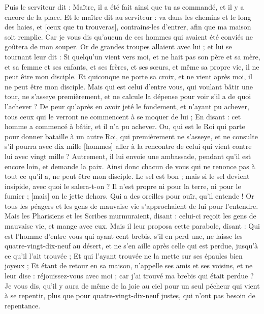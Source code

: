 \begin{multicols}{2}
Puis le serviteur dit : Maître, il a été fait ainsi que tu as commandé, et il y a encore de la place.
Et le maître dit au serviteur : va dans les chemins et le long des haies, et [ceux que tu trouveras], contrains-les d'entrer, afin que ma maison soit remplie.
Car je vous dis qu'aucun de ces hommes qui avaient été conviés ne goûtera de mon souper.
Or de grandes troupes allaient avec lui ; et lui se tournant leur dit :
Si quelqu'un vient vers moi, et ne hait pas son père et sa mère, et sa femme et ses enfants, et ses frères, et ses sœurs, et même sa propre vie, il ne peut être mon disciple.
Et quiconque ne porte sa croix, et ne vient après moi, il ne peut être mon disciple.
Mais qui est celui d'entre vous, qui voulant bâtir une tour, ne s'asseye premièrement, et ne calcule la dépense pour voir s'il a de quoi l'achever ?
De peur qu'après en avoir jeté le fondement, et n'ayant pu achever, tous ceux qui le verront ne commencent à se moquer de lui ;
En disant : cet homme a commencé à bâtir, et il n'a pu achever.
Ou, qui est le Roi qui parte pour donner bataille à un autre Roi, qui premièrement ne s'asseye, et ne consulte s'il pourra avec dix mille [hommes] aller à la rencontre de celui qui vient contre lui avec vingt mille ?
Autrement, il lui envoie une ambassade, pendant qu'il est encore loin, et demande la paix.
Ainsi donc chacun de vous qui ne renonce pas à tout ce qu'il a, ne peut être mon disciple.
Le sel est bon ; mais si le sel devient insipide, avec quoi le salera-t-on ?
Il n'est propre ni pour la terre, ni pour le fumier ; [mais] on le jette dehors. Qui a des oreilles pour ouïr, qu'il entende !
\VerseOne{}Or tous les péagers et les gens de mauvaise vie s'approchaient de lui pour l'entendre.
Mais les Pharisiens et les Scribes murmuraient, disant : celui-ci reçoit les gens de mauvaise vie, et mange avec eux.
Mais il leur proposa cette parabole, disant :
Qui est l'homme d'entre vous qui ayant cent brebis, s'il en perd une, ne laisse les quatre-vingt-dix-neuf au désert, et ne s'en aille après celle qui est perdue, jusqu'à ce qu'il l'ait trouvée ;
Et qui l'ayant trouvée ne la mette sur ses épaules bien joyeux ;
Et étant de retour en sa maison, n'appelle ses amis et ses voisins, et ne leur dise : réjouissez-vous avec moi ; car j'ai trouvé ma brebis qui était perdue ?
Je vous dis, qu'il y aura de même de la joie au ciel pour un seul pécheur qui vient à se repentir, plus que pour quatre-vingt-dix-neuf justes, qui n'ont pas besoin de repentance.

\end{multicols}
